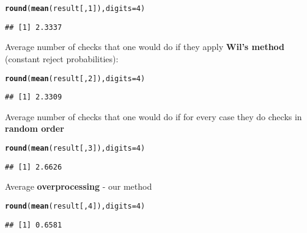 \documentclass{article}\usepackage[]{graphicx}\usepackage[]{color}
\makeatletter
\newcommand{\hlnum}[1]{\textcolor[rgb]{0.686,0.059,0.569}{#1}}%
\newcommand{\hlstd}[1]{\textcolor[rgb]{0.345,0.345,0.345}{#1}}%
\newcommand{\hlkwc}[1]{\textcolor[rgb]{0.333,0.667,0.333}{#1}}%
\newcommand{\hlkwd}[1]{\textcolor[rgb]{0.737,0.353,0.396}{\textbf{#1}}}%
\newenvironment{kframe}{%
 \def\at@end@of@kframe{}%
 \ifinner\ifhmode%
  \def\at@end@of@kframe{\end{minipage}}%
  \begin{minipage}{\columnwidth}%
 \fi\fi%
 \def\FrameCommand##1{\hskip\@totalleftmargin \hskip-\fboxsep
 \colorbox{shadecolor}{##1}\hskip-\fboxsep
     \hskip-\linewidth \hskip-\@totalleftmargin \hskip\columnwidth}%
 \MakeFramed {\advance\hsize-\width
   \@totalleftmargin\z@ \linewidth\hsize
   \@setminipage}}%
 {\par\unskip\endMakeFramed%
 \at@end@of@kframe}
\newenvironment{knitrout}{}{} %
\makeatother
\begin{document}
\begin{knitrout}
\color{fgcolor}\begin{kframe}
\begin{alltt}
\hlkwd{round}\hlstd{(}\hlkwd{mean}\hlstd{(result[,}\hlnum{1}\hlstd{]),}\hlkwc{digits} \hlstd{=} \hlnum{4}\hlstd{)}
\end{alltt}
\begin{verbatim}
## [1] 2.3337
\end{verbatim}
\end{kframe}
\end{knitrout}

Average number of checks that one would do if they apply \textbf{Wil's method} (constant reject probabilities):

\begin{knitrout}
\color{fgcolor}\begin{kframe}
\begin{alltt}
\hlkwd{round}\hlstd{(}\hlkwd{mean}\hlstd{(result[,}\hlnum{2}\hlstd{]),}\hlkwc{digits} \hlstd{=} \hlnum{4}\hlstd{)}
\end{alltt}
\begin{verbatim}
## [1] 2.3309
\end{verbatim}
\end{kframe}
\end{knitrout}

Average number of checks that one would do if for every case they do checks in \textbf{random order}

\begin{knitrout}
\color{fgcolor}\begin{kframe}
\begin{alltt}
\hlkwd{round}\hlstd{(}\hlkwd{mean}\hlstd{(result[,}\hlnum{3}\hlstd{]),}\hlkwc{digits} \hlstd{=} \hlnum{4}\hlstd{)}
\end{alltt}
\begin{verbatim}
## [1] 2.6626
\end{verbatim}
\end{kframe}
\end{knitrout}

Average \textbf{overprocessing} - our method

\begin{knitrout}
\color{fgcolor}\begin{kframe}
\begin{alltt}
\hlkwd{round}\hlstd{(}\hlkwd{mean}\hlstd{(result[,}\hlnum{4}\hlstd{]),}\hlkwc{digits} \hlstd{=} \hlnum{4}\hlstd{)}
\end{alltt}
\begin{verbatim}
## [1] 0.6581
\end{verbatim}
\end{kframe}
\end{knitrout}
\end{document}

